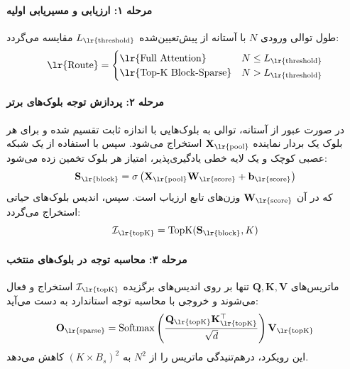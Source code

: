 \paragraph{مرحله ۱: ارزیابی و مسیریابی اولیه }
طول توالی ورودی $N$ با آستانه از پیش‌تعیین‌شده $L_{\text{\lr{threshold}}}$ مقایسه می‌گردد:
\begin{equation}
\text{\lr{Route}} = \begin{cases}
\text{\lr{Full Attention}} & N \le L_{\text{\lr{threshold}}} \\
\text{\lr{Top-K Block-Sparse}} & N > L_{\text{\lr{threshold}}}
\end{cases}
\end{equation}

\paragraph{مرحله ۲: پردازش توجه بلوک‌های برتر }
در صورت عبور از آستانه، توالی به بلوک‌هایی با اندازه ثابت تقسیم شده و برای هر بلوک یک بردار نماینده $\mathbf{X}_{\text{\lr{pool}}}$ استخراج می‌شود. سپس با استفاده از یک شبکه عصبی کوچک و یک لایه خطی یادگیری‌پذیر، امتیاز هر بلوک تخمین زده می‌شود:
\begin{equation}
\mathbf{S}_{\text{\lr{block}}} = \sigma\left(\mathbf{X}_{\text{\lr{pool}}} \mathbf{W}_{\text{\lr{score}}} + \mathbf{b}_{\text{\lr{score}}}\right)
\end{equation}
که در آن $\mathbf{W}_{\text{\lr{score}}}$ وزن‌های تابع ارزیاب است. سپس، اندیس بلوک‌های حیاتی استخراج می‌گردد:
\begin{equation}
\mathcal{I}_{\text{\lr{topK}}} = \operatorname{TopK}(\mathbf{S}_{\text{\lr{block}}}, K)
\end{equation}

\paragraph{مرحله ۳: محاسبه توجه در بلوک‌های منتخب }
ماتریس‌های $\mathbf{Q}, \mathbf{K}, \mathbf{V}$ تنها بر روی اندیس‌های برگزیده $\mathcal{I}_{\text{\lr{topK}}}$ استخراج و فعال می‌شوند و خروجی با محاسبه توجه استاندارد به دست می‌آید:
\begin{equation}
\mathbf{O}_{\text{\lr{sparse}}} = \operatorname{Softmax}\left(\frac{\mathbf{Q}_{\text{\lr{topK}}} \mathbf{K}_{\text{\lr{topK}}}^\top}{\sqrt{d}}\right) \mathbf{V}_{\text{\lr{topK}}}
\end{equation}
این رویکرد، درهم‌تنیدگی ماتریس را از $N^2$ به $(K \times B_s)^2$ کاهش می‌دهد.


